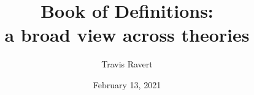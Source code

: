 \documentclass[10pt, openany]{book}
\begin{document}
	
	\author{Travis Ravert}
	\title{Book of Definitions: \\ a broad view across theories}
	\date{February 13, 2021}
	\frontmatter
	\maketitle
	\tableofcontents
	\mainmatter
	
	
	
	
	
	
	
	
	\backmatter
\end{document}
